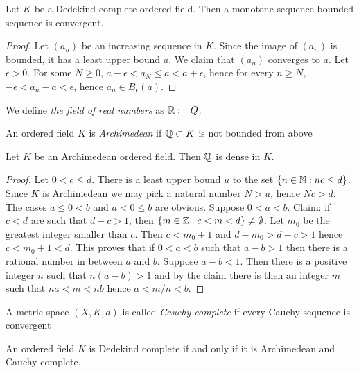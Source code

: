     \begin{lemma}\label{MonotoneBoundedDedikindImpliesConv}
        Let $K$ be a Dedekind complete ordered field. Then a monotone sequence bounded sequence is convergent.
    \end{lemma}
    \begin{proof}
        Let $(a_n)$ be an increasing sequence in $K$. Since the image of $(a_n)$ is bounded, it has a least upper bound $a$. We claim that $(a_n)$ converges to $a$. Let $\epsilon >0$. For some $N\geq 0$, $a-\epsilon < a_N \leq a < a+\epsilon$, hence for every $n\geq N$, $-\epsilon < a_n - a < \epsilon$, hence $a_n\in B_\epsilon (a)$.
    \end{proof}
    \begin{definition}
        We define \textit{the field of real numbers} as $\mathbb{R}:=\overline{Q}$.
    \end{definition}
     \begin{definition}
        An ordered field $K$ is \textit{Archimedean} if $\mathbb{Q}\subset K$ is not bounded from above
    \end{definition}
    \begin{lemma}
        Let $K$ be an Archimedean ordered field. Then $\mathbb{Q}$ is dense in $K$.
    \end{lemma}
    \begin{proof}
        Let $0<c\leq d$. There is a least upper bound $u$ to the set $\{n\in \mathbb{N}: nc \leq d\}$. Since $K$ is Archimedean we may pick a natural number $N>u$, hence $Nc>d$. The cases $a\leq 0<b$ and $a<0\leq b$ are obvious. Suppose $0<a<b$. Claim: if $c<d$ are such that $d-c>1$, then $\{m\in \mathbb{Z} : c<m<d\}\neq \emptyset$. Let $m_0$ be the greatest integer smaller than $c$. Then $c< m_0+1$ and $d-m_0 > d-c>1$ hence $c<m_0+1<d$.
        This proves that if $0<a<b$ such that $a-b>1$ then there is a rational number in between $a$ and $b$. Suppose $a-b<1$. Then there is a positive integer $n$ such that $n(a-b)>1$ and by the claim there is then an integer $m$ such that $na < m < nb$ hence $a<m/n <b$. 
    \end{proof}
    \begin{definition}
        A metric space $(X,K,d)$ is called \textit{Cauchy complete} if every Cauchy sequence is convergent
    \end{definition}
      \begin{lemma}
        An ordered field $K$ is Dedekind complete if and only if it is Archimedean and Cauchy complete.
    \end{lemma}
